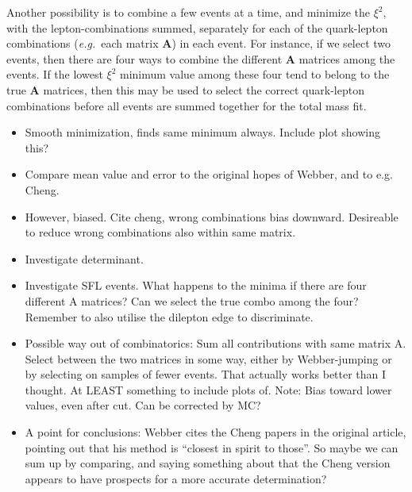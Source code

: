 \documentclass[twoside,english]{uiofysmaster}
\begin{document}
Another possibility is to combine a few events at a time, and minimize the $\xi^2$, with the lepton-combinations summed, separately for each of the quark-lepton combinations ({\it e.g.}\ each matrix $\mathbf{A}$) in each event. For instance, if we select two events, then there are four ways to combine the different $\mathbf{A}$ matrices among the events. If the lowest $\xi^2$ minimum value among these four tend to belong to the true $\mathbf{A}$ matrices, then this may be used to select the correct quark-lepton combinations before all events are summed together for the total mass fit. 





\begin{itemize}
\item Smooth minimization, finds same minimum always. Include plot showing this?
\item Compare mean value and error to the original hopes of Webber, and to e.g. Cheng. 
\item However, biased. Cite cheng, wrong combinations bias downward. Desireable to reduce wrong combinations also within same matrix.
\item Investigate determinant.
\item Investigate SFL events. What happens to the minima if there are four different A matrices? Can we select the true combo among the four? Remember to also utilise the dilepton edge to discriminate.
\item Possible way out of combinatorics: Sum all contributions with same matrix A. Select between the two matrices in some way, either by Webber-jumping or by selecting on samples of fewer events. That actually works better than I thought. At LEAST something to include plots of. Note: Bias toward lower values, even after cut. Can be corrected by MC? 
\item A point for conclusions: Webber cites the Cheng papers in the original article, pointing out that his method is ``closest in spirit to those''. So maybe we can sum up by comparing, and saying something about that the Cheng version appears to have prospects for a more accurate determination?
\end{itemize}
\end{document}
